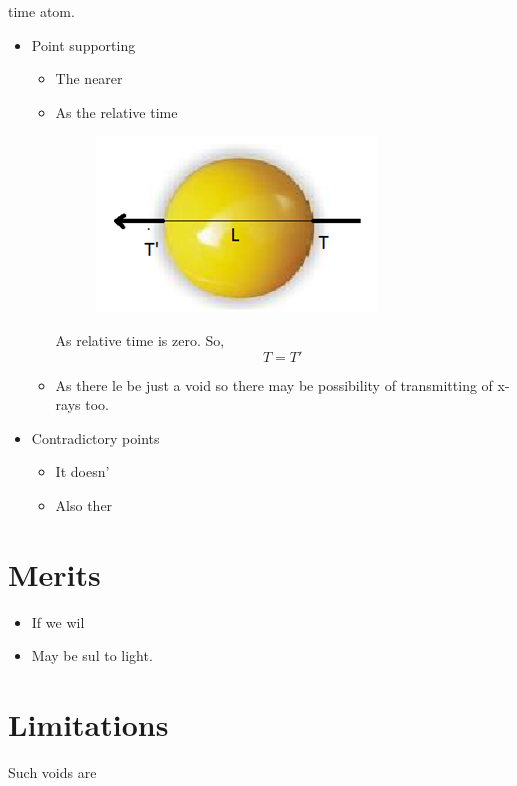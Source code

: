 \documentclass[conference]{IEEEtran}
\begin{document}
\begin{enumerate}
time atom. \\
\begin{itemize}
\item 	Point supporting
\begin{itemize}
\item	The nearer 
\item	As the relative time \\
\begin{figure}[htbp]
	\centering
		\includegraphics[scale=0.5]{img3.png}
\end{figure}
As relative time is zero. So,
$$ T=T'\, $$
\item	As there le be just a void so there may be possibility of transmitting of x-rays too.
\end{itemize}
\item	Contradictory points
\begin{itemize}
\item	It doesn'
\item	Also ther
\end{itemize}
\end{itemize}
\end{enumerate}
\section{Merits}
\begin{itemize}
\item	If we wil
\item	May be sul to light.
\end{itemize}

\section{Limitations}
Such voids are 
\end{document}
